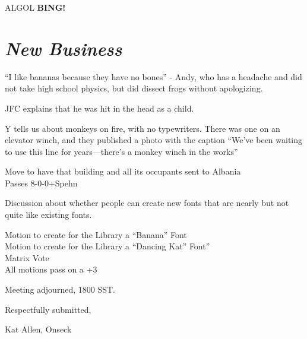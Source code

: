 \documentclass[10pt]{article}
\newcommand{\bing}{{\bf BING!} }
\newcommand{\goto}[1]{\bing \vskip 12pt \section*{{\em{#1}}}}
\begin{document}
ALGOL
\goto{New Business}
``I like bananas because they have no bones'' - Andy, who has a
headache and did not take high school physics, but did dissect frogs
without apologizing.

JFC explains that he was hit in the head as a child.

Y tells us about monkeys on fire, with no typewriters.
There was one on an elevator winch, and they published a photo with
the caption ``We've been waiting to use this line for years---there's
a monkey winch in the works''

Move to have that building and all its occupants sent to Albania\\
Passes 8-0-0+Spehn

Discussion about whether people can create new fonts that are nearly
but not quite like existing fonts.

Motion to create for the Library a ``Banana'' Font\\
Motion to create for the Library a ``Dancing Kat'' Font''\\
Matrix Vote\\
All motions pass on a +3

\vspace{12pt}

\noindent
Meeting adjourned, 1800 SST.

\vspace{18pt}

\centerline{Respectfully submitted,}
\centerline{Kat Allen,  Onseck}
\end{document}
